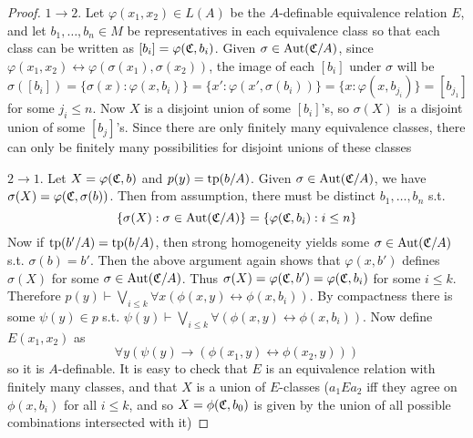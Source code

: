 \documentclass[11pt]{article}
\begin{document}
\begin{proof}
\label{Problem12}
\(1\to 2\). Let \(\varphi(x_1,x_2)\in L(A)\) be the \(A\)-definable equivalence relation \(E\), and
let \(b_1,\dots,b_n\in M\) be representatives in each equivalence class so that each class can be
written as \([b_i]=\varphi(\mathfrak{C},b_i)\). Given \(\sigma\in\operatorname{\text{Aut}}(\mathfrak{C}/A)\), since \(\varphi(x_1,x_2)\leftrightarrow\varphi(\sigma(x_1),\sigma(x_2))\), the image
of each \([b_i]\) under \(\sigma\) will be
\begin{equation*}
\sigma([b_i])=\{\sigma(x):\varphi(x,b_i)\}=\{x':\varphi(x',\sigma(b_i))\}=\{x:\varphi(x,b_{j_i})\}=[b_{j_1}]
\end{equation*}
for some \(j_i\le n\). Now \(X\) is a disjoint union of some \([b_i]\)'s, so \(\sigma(X)\) is a disjoint
union of some \([b_j]\)'s. Since there are only finitely many equivalence classes, there can
only be finitely many possibilities for disjoint unions of these classes

\(2\to 1\). Let \(X=\varphi(\mathfrak{C},b)\) and \(p(y)=\operatorname{tp}(b/A)\). Given \(\sigma\in\operatorname{\text{Aut}}(\mathfrak{C}/A)\), we
have \(\sigma(X)=\varphi(\mathfrak{C},\sigma(b))\). Then from assumption, there must be distinct \(b_1,\dots,b_n\) s.t.
\begin{equation*}
\{\sigma(X):\sigma\in\operatorname{\text{Aut}}(\mathfrak{C}/A)\}=\{\varphi(\mathfrak{C},b_i):i\le n\}
\end{equation*}
Now if \(\operatorname{tp}(b'/A)=\operatorname{tp}(b/A)\), then strong homogeneity yields some \(\sigma\in\operatorname{\text{Aut}}(\mathfrak{C}/A)\)
s.t. \(\sigma(b)=b'\). Then the above argument again shows that \(\varphi(x,b')\) defines \(\sigma(X)\) for
some \(\sigma\in\operatorname{\text{Aut}}(\mathfrak{C}/A)\). Thus \(\sigma(X)=\varphi(\mathfrak{C},b')=\varphi(\mathfrak{C},b_i)\) for some \(i\le k\). Therefore
\(p(y)\vdash\bigvee_{i\le k}\forall x(\phi(x,y)\leftrightarrow\phi(x,b_i))\). By compactness there is
some \(\psi(y)\in p\) s.t. \(\psi(y)\vdash\bigvee_{i\le k}\forall(\phi(x,y)\leftrightarrow\phi(x,b_i))\). Now define \(E(x_1,x_2)\) as
\begin{equation*}
\forall y(\psi(y)\to(\phi(x_1,y)\leftrightarrow\phi(x_2,y)))
\end{equation*}
so it is \(A\)-definable. It is easy to check that \(E\) is an equivalence relation with
finitely many classes, and that \(X\) is a union of \(E\)-classes (\(a_1Ea_2\) iff they agree on
\(\phi(x,b_i)\) for all \(i\le k\), and so \(X=\phi(\mathfrak{C},b_0)\) is given by the union of all possible
combinations intersected with it)


\end{proof}
\end{document}
